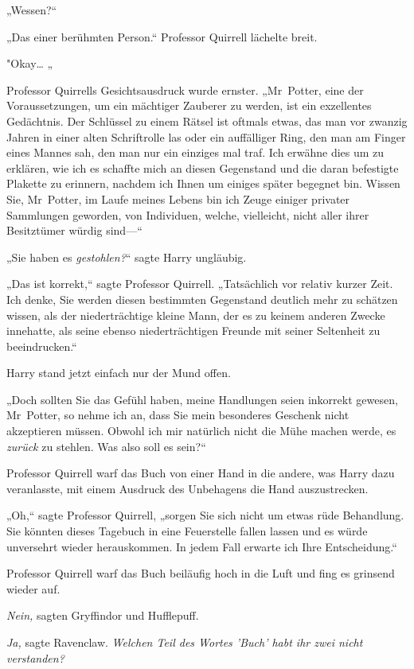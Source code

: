 {„Wessen?“

„Das einer berühmten Person.“ Professor Quirrell lächelte breit.

"Okay… „

Professor Quirrells Gesichtsausdruck wurde ernster. „Mr~Potter, eine der Voraussetzungen, um ein mächtiger Zauberer zu werden, ist ein exzellentes Gedächtnis. Der Schlüssel zu einem Rätsel ist oftmals etwas, das man vor zwanzig Jahren in einer alten Schriftrolle las oder ein auffälliger Ring, den man am Finger eines Mannes sah, den man nur ein einziges mal traf. Ich erwähne dies um zu erklären, wie ich es schaffte mich an diesen Gegenstand und die daran befestigte Plakette zu erinnern, nachdem ich Ihnen um einiges später begegnet bin. Wissen Sie, Mr~Potter, im Laufe meines Lebens bin ich Zeuge einiger privater Sammlungen geworden, von Individuen, welche, vielleicht, nicht aller ihrer Besitztümer würdig sind—“

„Sie haben es \emph{gestohlen?}“ sagte Harry ungläubig.

„Das ist korrekt,“ sagte Professor Quirrell. „Tatsächlich vor relativ kurzer Zeit. Ich denke, Sie werden diesen bestimmten Gegenstand deutlich mehr zu schätzen wissen, als der niederträchtige kleine Mann, der es zu keinem anderen Zwecke innehatte, als seine ebenso niederträchtigen Freunde mit seiner Seltenheit zu beeindrucken.“

Harry stand jetzt einfach nur der Mund offen.

„Doch sollten Sie das Gefühl haben, meine Handlungen seien inkorrekt gewesen, Mr~Potter, so nehme ich an, dass Sie mein besonderes Geschenk nicht akzeptieren müssen. Obwohl ich mir natürlich nicht die Mühe machen werde, es \emph{zurück} zu stehlen. Was also soll es sein?“

Professor Quirrell warf das Buch von einer Hand in die andere, was Harry dazu veranlasste, mit einem Ausdruck des Unbehagens die Hand auszustrecken.

„Oh,“ sagte Professor Quirrell, „sorgen Sie sich nicht um etwas rüde Behandlung. Sie könnten dieses Tagebuch in eine Feuerstelle fallen lassen und es würde unversehrt wieder herauskommen. In jedem Fall erwarte ich Ihre Entscheidung.“

Professor Quirrell warf das Buch beiläufig hoch in die Luft und fing es grinsend wieder auf.

\emph{Nein,} sagten Gryffindor und Hufflepuff.

\emph{Ja,} sagte Ravenclaw. \emph{Welchen Teil des Wortes 'Buch' habt ihr zwei nicht} \emph{verstanden?}

}
